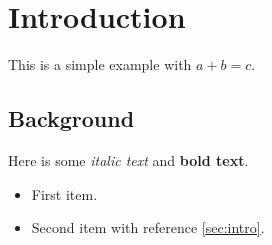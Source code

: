 \documentclass{article}
\begin{document}
\section{Introduction}
This is a simple example with $a + b = c$.

\subsection{Background}
Here is some \emph{italic text} and \textbf{bold text}.

\begin{itemize}
  \item First item.
  \item Second item with reference \ref{sec:intro}.
\end{itemize}

\label{sec:intro}
\end{document}
